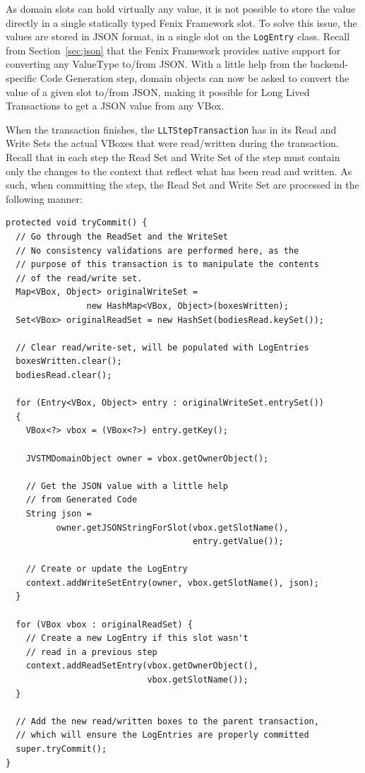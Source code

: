 As domain slots can hold virtually any value, it is not possible to
store the value directly in a single statically typed Fenix Framework
slot. To solve this issue, the values are stored in JSON format, in a
single slot on the \texttt{LogEntry} class. Recall from
Section~\ref{sec:json} that the Fenix Framework provides native
support for converting any ValueType to/from JSON. With a little help
from the backend-specific Code Generation step, domain objects can now
be asked to convert the value of a given slot to/from JSON, making it
possible for Long Lived Transactions to get a JSON value from any
VBox.

When the transaction finishes, the \texttt{LLTStepTransaction} has in
its Read and Write Sets the actual VBoxes that were read/written
during the transaction. Recall that in each step the Read Set and
Write Set of the step must contain only the changes to the context
that reflect what has been read and written. As such, when committing
the step, the Read Set and Write Set are processed in the following
manner:

\begin{lstlisting}[caption={Algorithm for committing a Long Lived
    Transaction's step}, float]
protected void tryCommit() {
  // Go through the ReadSet and the WriteSet
  // No consistency validations are performed here, as the 
  // purpose of this transaction is to manipulate the contents
  // of the read/write set.
  Map<VBox, Object> originalWriteSet = 
                new HashMap<VBox, Object>(boxesWritten);
  Set<VBox> originalReadSet = new HashSet(bodiesRead.keySet());

  // Clear read/write-set, will be populated with LogEntries
  boxesWritten.clear();
  bodiesRead.clear();

  for (Entry<VBox, Object> entry : originalWriteSet.entrySet()) 
  {
    VBox<?> vbox = (VBox<?>) entry.getKey();

    JVSTMDomainObject owner = vbox.getOwnerObject();

    // Get the JSON value with a little help
    // from Generated Code
    String json = 
          owner.getJSONStringForSlot(vbox.getSlotName(), 
                                     entry.getValue());

    // Create or update the LogEntry
    context.addWriteSetEntry(owner, vbox.getSlotName(), json);
  }

  for (VBox vbox : originalReadSet) {
    // Create a new LogEntry if this slot wasn't
    // read in a previous step
    context.addReadSetEntry(vbox.getOwnerObject(), 
                            vbox.getSlotName());
  }

  // Add the new read/written boxes to the parent transaction,
  // which will ensure the LogEntries are properly committed
  super.tryCommit();
}
\end{lstlisting}

